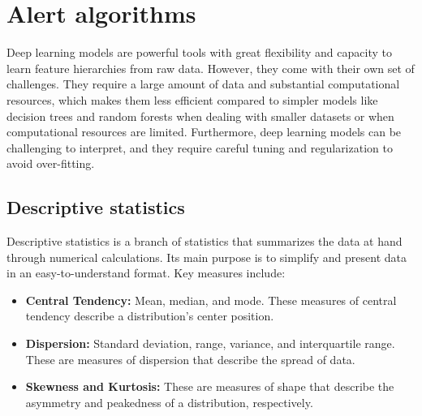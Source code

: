 
\section{Alert algorithms}

Deep learning models are powerful tools with great flexibility and capacity to learn feature hierarchies from raw data. However, they come with their own set of challenges. They require a large amount of data and substantial computational resources, which makes them less efficient compared to simpler models like decision trees and random forests when dealing with smaller datasets or when computational resources are limited. Furthermore, deep learning models can be challenging to interpret, and they require careful tuning and regularization to avoid over-fitting.

\subsection{Descriptive statistics}
Descriptive statistics is a branch of statistics that summarizes the data at hand through numerical calculations. Its main purpose is to simplify and present data in an easy-to-understand format. Key measures include:

\begin{itemize}
\item \textbf{Central Tendency:} Mean, median, and mode. These measures of central tendency describe a distribution's center position.
\item \textbf{Dispersion:} Standard deviation, range, variance, and interquartile range. These are measures of dispersion that describe the spread of data.
\item \textbf{Skewness and Kurtosis:} These are measures of shape that describe the asymmetry and peakedness of a distribution, respectively.
\end{itemize}

